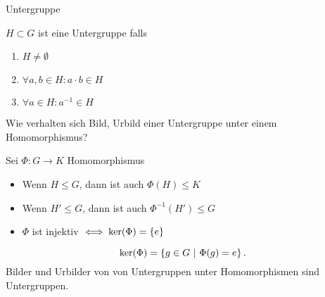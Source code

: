 \documentclass[class=article, crop=false]{standalone}
\begin{document}
\begin{zettel}{Untergruppe}
\begin{flashcard}[]{}
	\begin{definition}[Untergruppe]
		$H \subset G$ ist eine Untergruppe falls
		\begin{enumerate}
			\item $H \neq \emptyset$
			\item $\forall a,b \in  H \colon a \cdot b \in  H$
			\item $\forall a \in  H \colon a^{-1} \in  H$
		\end{enumerate}
	\end{definition}
\end{flashcard}

\begin{flashcard}[]{}
	\begin{question}
		Wie verhalten sich Bild, Urbild einer Untergruppe unter einem Homomorphismus?
	\end{question}
	\begin{theorem}
		Sei $\Phi: G \longrightarrow K$ Homomorphismus
		\begin{itemize}
			\item Wenn $H \leq  G$, dann ist auch $\Phi(H) \leq K$
			\item Wenn $H' \leq  G$, dann ist auch $\Phi^{-1} (H') \leq G$
			\item $\Phi$ ist injektiv $\iff \ker (\Phi) = \set{e}$
		\end{itemize}
		\[
			\ker (\Phi) = \set{g \in  G}{\Phi(g) = e}
		.\]
		Bilder und Urbilder von von Untergruppen unter Homomorphismen sind Untergruppen.

	\end{theorem}
\end{flashcard}
\end{zettel}
\end{document}
